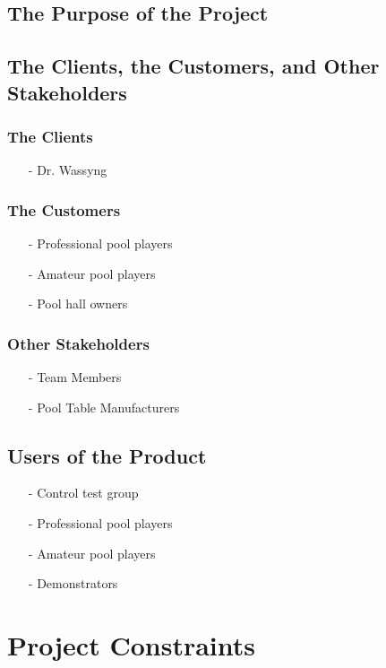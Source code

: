 \documentclass[titlepage]{article}
\begin{document}
 \subsection{The Purpose of the Project}
 
 \subsection{The Clients, the Customers, and Other Stakeholders}
 \subsubsection{The Clients}
 \begin{itemize}
 	\item[-] Dr. Wassyng
 \end{itemize}
 
 \subsubsection{The Customers}
 \begin{itemize}
 	\item[-] Professional pool players
 	\item[-] Amateur pool players
 	\item[-] Pool hall owners
 \end{itemize}
 
 \subsubsection{Other Stakeholders}
 \begin{itemize}
 	\item[-] Team Members
 	\item[-] Pool Table Manufacturers
 \end{itemize}
 
 \subsection{Users of the Product}
 \begin{itemize}
 	\item[-] Control test group
 	\item[-] Professional pool players
 	\item[-] Amateur pool players
 	\item[-] Demonstrators
 \end{itemize}
 
 
 \section{Project Constraints}
\end{document}
